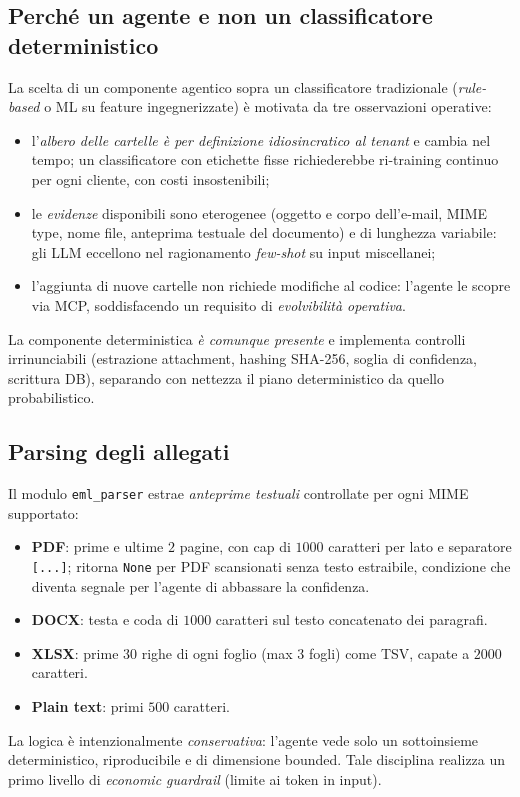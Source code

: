\documentclass[11pt,a4paper,oneside]{article}
\begin{document}
\subsection{Perch\'e un agente e non un classificatore deterministico}
La scelta di un componente agentico sopra un classificatore tradizionale
(\emph{rule-based} o ML su feature ingegnerizzate) \`e motivata da tre
osservazioni operative:
\begin{itemize}[leftmargin=*]
    \item l'\emph{albero delle cartelle \`e per definizione idiosincratico
          al tenant} e cambia nel tempo; un classificatore con etichette fisse
          richiederebbe ri-training continuo per ogni cliente, con costi
          insostenibili;
    \item le \emph{evidenze} disponibili sono eterogenee (oggetto e corpo
          dell'e-mail, MIME type, nome file, anteprima testuale del documento)
          e di lunghezza variabile: gli LLM eccellono nel ragionamento
          \emph{few-shot} su input miscellanei;
    \item l'aggiunta di nuove cartelle non richiede modifiche al codice:
          l'agente le scopre via MCP, soddisfacendo un requisito di
          \emph{evolvibilit\`a operativa}.
\end{itemize}
La componente deterministica \emph{\`e comunque presente} e implementa
controlli irrinunciabili (estrazione attachment, hashing SHA-256, soglia di
confidenza, scrittura DB), separando con nettezza il piano deterministico da
quello probabilistico.

\subsection{Parsing degli allegati}
\label{sec:eml-parser}
Il modulo \texttt{eml\_parser} estrae \emph{anteprime testuali} controllate
per ogni MIME supportato:
\begin{itemize}[leftmargin=*]
    \item \textbf{PDF}: prime e ultime $2$ pagine, con cap di $1000$ caratteri
          per lato e separatore \texttt{[...]}; ritorna \texttt{None} per PDF
          scansionati senza testo estraibile, condizione che diventa segnale
          per l'agente di abbassare la confidenza.
    \item \textbf{DOCX}: testa e coda di $1000$ caratteri sul testo
          concatenato dei paragrafi.
    \item \textbf{XLSX}: prime $30$ righe di ogni foglio (max $3$ fogli) come
          TSV, capate a $2000$ caratteri.
    \item \textbf{Plain text}: primi $500$ caratteri.
\end{itemize}
La logica \`e intenzionalmente \emph{conservativa}: l'agente vede solo un
sottoinsieme deterministico, riproducibile e di dimensione bounded. Tale
disciplina realizza un primo livello di \emph{economic guardrail} (limite ai
token in input).
\end{document}
